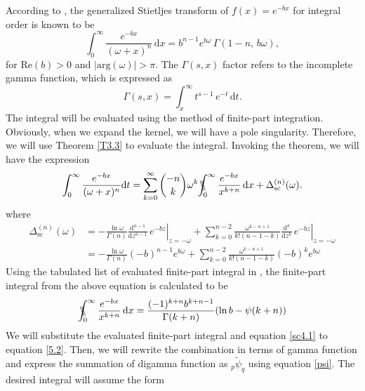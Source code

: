 According to \cite{erdelyi1954tables}, the generalized Stietljes transform of $f(x) = e^{-bx}$ for integral order is known to be 
\begin{equation} \label{5.1}
    \int_0^{\infty} \frac{e^{-bx}}{(\omega + x)^{n}} \, \mathrm{d}x = b^{n-1}e^{b\omega} \, \Gamma(1-n,\, b\omega),
\end{equation}
for $\mathrm{Re}(b)>0$ and $|\mathrm{arg}(\omega)|>\pi$. The $\Gamma(s,x)$ factor refers to the incomplete gamma function, which is expressed as
\begin{equation}
    \Gamma(s,x) = \int_{x}^{\infty} t^{s-1} \, e^{-t} \, \mathrm{d}t.
\end{equation} 
The integral will be evaluated using the method of finite-part integration. Obviously, when we expand the kernel, we will have a pole singularity. Therefore, we will use Theorem \ref{T3.3} to evaluate the integral. Invoking the theorem, we will have the expression
\begin{equation} \label{5.2}
    \int_0^{\infty} \frac{e^{-bx}}{(\omega + x)^{n}} \mathrm{d}t = \sum_{k=0}^{\infty} \binom{-n}{k} \omega^{k} \bbint{0}{\infty} \frac{e^{-bx}}{x^{k+n}} \, \mathrm{d}x + \Delta_{\mathrm{sc}}^{(n)}(\omega).
\end{equation}
where 
\begin{equation}
\begin{split} \label{sc4.1}
    \Delta_{\mathrm{sc}}^{(n)}(\omega) & =  -\frac{\ln{\omega}}{\Gamma(n)} \left. \frac{\mathrm{d}^{n-1}}{\mathrm{d}z^{n-1}} \,  e^{-bz} \right|_{z=-\omega} + \sum_{k=0}^{n-2} \frac{\omega^{k-n+1}}{k!(n-1-k)} \left. \frac{\mathrm{d}^{k}}{\mathrm{d}z^{k}} \,  e^{-bz} \right|_{z=-\omega} 
    \\& = -\frac{\ln{\omega}}{\Gamma(n)} (-b)^{n-1} e^{b\omega} + \sum_{k=0}^{n-2} \frac{\omega^{k-n+1}}{k!(n-1-k)} (-b)^{k} e^{b\omega}
\end{split}
\end{equation}
Using the tabulated list of evaluated finite-part integral in \cite{ticathetit}, the finite-part integral from the above equation is calculated to be
\begin{equation}
    \bbint{0}{\infty} \frac{e^{-bx}}{x^{k+n}} \, \mathrm{d}x = \frac{(-1)^{k+n} b^{k+n-1}}{\Gamma(k+n)} (\ln{b} - \psi(k+n))
\end{equation}
We will substitute the evaluated finite-part integral and equation \eqref{sc4.1} to equation \eqref{5.2}. Then, we will rewrite the combination in terms of gamma function and express the summation of digamma function as ${}_p\tilde{\psi}_{q}$ using equation \eqref{psi}. The desired integral will assume the form
